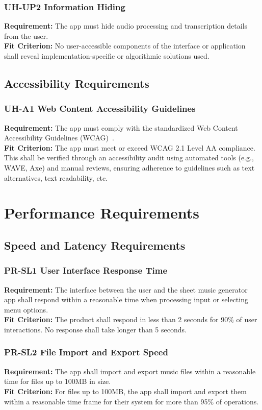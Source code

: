 \documentclass[12pt]{article}
\begin{document}
\subsubsection*{UH-UP2 Information Hiding}
\textbf{Requirement:} The app must hide audio processing and transcription details from the user.\\
\textbf{Fit Criterion:} No user-accessible components of the interface or application shall reveal
implementation-specific or algorithmic solutions used.
\subsection{Accessibility Requirements}
\subsubsection*{UH-A1 Web Content Accessibility Guidelines}
\textbf{Requirement:} The app must comply with the standardized Web Content Accessibility Guidelines (WCAG)~\cite{WCAG21}.\\
\textbf{Fit Criterion:} The app must meet or exceed WCAG 2.1 Level AA compliance. This shall be verified through 
an accessibility audit using automated tools (e.g., WAVE, Axe) and manual reviews, ensuring adherence to guidelines 
such as text alternatives, text readability, etc.
\section{Performance Requirements}
\subsection{Speed and Latency Requirements}
\subsubsection*{PR-SL1 User Interface Response Time}
\textbf{Requirement:} The interface between the user and the sheet music generator app shall respond within a reasonable time when processing input or selecting menu options.\\
\textbf{Fit Criterion:} The product shall respond in less than 2 seconds for 90\% of user interactions. No response shall take longer than 5 seconds.
\subsubsection*{PR-SL2 File Import and Export Speed}
\textbf{Requirement:} The app shall import and export music files within a reasonable time for files up to 100MB in size.\\
\textbf{Fit Criterion:} For files up to 100MB, the app shall import and export them within a reasonable time frame for their system for more than 95\% of operations.
\end{document}
